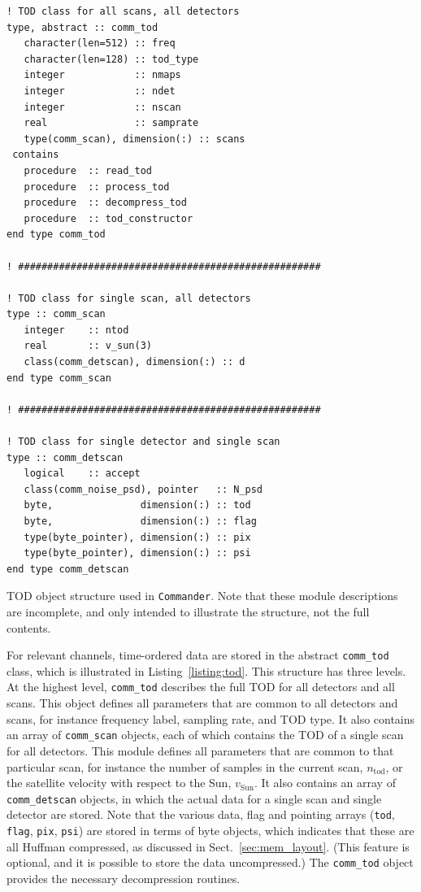 \documentclass[twocolumn]{aa}
\def\commander{\texttt{Commander}}
\begin{document}
\begin{lstfloat}[t]
  {\scriptsize
    \begin{tcolorbox}
\begin{lstlisting}
! TOD class for all scans, all detectors
type, abstract :: comm_tod
   character(len=512) :: freq
   character(len=128) :: tod_type
   integer            :: nmaps  
   integer            :: ndet   
   integer            :: nscan  
   real               :: samprate
   type(comm_scan), dimension(:) :: scans
 contains
   procedure  :: read_tod
   procedure  :: process_tod
   procedure  :: decompress_tod
   procedure  :: tod_constructor
end type comm_tod
   
! ####################################################

! TOD class for single scan, all detectors
type :: comm_scan
   integer    :: ntod
   real       :: v_sun(3)
   class(comm_detscan), dimension(:) :: d
end type comm_scan

! ####################################################

! TOD class for single detector and single scan
type :: comm_detscan
   logical    :: accept
   class(comm_noise_psd), pointer   :: N_psd
   byte,               dimension(:) :: tod
   byte,               dimension(:) :: flag
   type(byte_pointer), dimension(:) :: pix
   type(byte_pointer), dimension(:) :: psi
end type comm_detscan
\end{lstlisting}
    \end{tcolorbox}
}
\caption{TOD object structure used in \commander. Note that these
  module descriptions are incomplete, and only intended to illustrate
  the structure, not the full contents. }\label{listing:tod}
\end{lstfloat}

For relevant channels, time-ordered data are stored in the abstract
\texttt{comm\_tod} class, which is illustrated in
Listing~\ref{listing:tod}. This structure has three levels. At the
highest level, \texttt{comm\_tod} describes the full TOD for all
detectors and all scans. This object defines all parameters that are
common to all detectors and scans, for instance frequency label,
sampling rate, and TOD type. It also contains an array of
\texttt{comm\_scan} objects, each of which contains the TOD of a
single scan for all detectors. This module defines all parameters that
are common to that particular scan, for instance the number of samples
in the current scan, $n_{\mathrm{tod}}$, or the satellite velocity
with respect to the Sun, $v_{\mathrm{Sun}}$. It also contains an array
of \texttt{comm\_detscan} objects, in which the actual data for a
single scan and single detector are stored. Note that the various
data, flag and pointing arrays (\texttt{tod}, \texttt{flag},
\texttt{pix}, \texttt{psi}) are stored in terms of byte objects, which
indicates that these are all Huffman compressed, as discussed in
Sect.~\ref{sec:mem_layout}. (This feature is optional, and it is
possible to store the data uncompressed.) The \texttt{comm\_tod}
object provides the necessary decompression routines.
\end{document}
